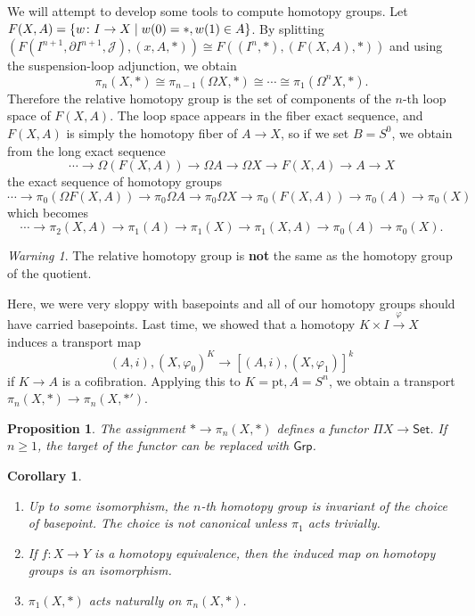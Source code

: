 \documentclass[leqno, openany]{memoir}
\newtheorem{cor}[thm]{Corollary}
\newtheorem{prop}[thm]{Proposition}
\theoremstyle{definition}
\theoremstyle{remark}
\newtheorem{warn}[thm]{Warning}
\theoremstyle{plain}
\theoremstyle{definition}
\theoremstyle{remark}
\newcommand{\mc}[1]{\mathcal{#1}}
\newcommand{\mr}[1]{\mathrm{#1}}
\newcommand{\ms}[1]{\mathsf{#1}}
\begin{document}
We will attempt to develop some tools to compute homotopy groups. Let $F(X,A) = \qty{w \colon I \to X \mid w(0) = *, w(1) \in A}$. By splitting $(F(I^{n+1}, \partial I^{n+1}, \mc{J}), (x, A, *)) \cong F((I^n, *), (F(X,A), *))$ and using the suspension-loop adjunction, we obtain
\[ \pi_n(X, *) \cong \pi_{n-1}(\Omega X, *) \cong \cdots \cong \pi_1(\Omega^n X, *). \]
Therefore the relative homotopy group is the set of components of the $n$-th loop space of $F(X,A)$. The loop space appears in the fiber exact sequence, and $F(X,A)$ is simply the homotopy fiber of $A \to X$, so if we set $B = S^0$, we obtain from the long exact sequence
\[ \cdots \to \Omega(F(X,A)) \to \Omega A \to \Omega X \to F(X,A) \to A \to X \]
the exact sequence of homotopy groups
\[ \cdots \to \pi_0(\Omega F(X,A)) \to \pi_0 \Omega A \to \pi_0 \Omega X \to \pi_0(F(X,A)) \to \pi_0(A) \to \pi_0(X) \]
which becomes
\[ \cdots \to \pi_2(X,A) \to \pi_1(A) \to \pi_1(X) \to \pi_1(X,A) \to \pi_0(A) \to \pi_0(X). \]
\begin{warn}
    The relative homotopy group is \textbf{not} the same as the homotopy group of the quotient. 
\end{warn}

Here, we were very sloppy with basepoints and all of our homotopy groups should have carried basepoints. Last time, we showed that a homotopy $K \times I \xrightarrow{\varphi} X$ induces a transport map
\[ (A, i), (X, \varphi_0)^K \to [(A,i), (X, \varphi_1)]^k \]
if $K \to A$ is a cofibration. Applying this to $K = \mr{pt}, A = S^n$, we obtain a transport $\pi_n(X, *) \to \pi_n(X, *')$.

\begin{prop}
    The assignment $* \to \pi_n(X, *)$ defines a functor $\Pi X \to \ms{Set}$. If $n \geq 1$, the target of the functor can be replaced with $\ms{Grp}$.
\end{prop}

\begin{cor}
    \begin{enumerate}
        \item Up to some isomorphism, the $n$-th homotopy group is invariant of the choice of basepoint. The choice is not canonical unless $\pi_1$ acts trivially.
        \item If $f \colon X \to Y$ is a homotopy equivalence, then the induced map on homotopy groups is an isomorphism.
        \item $\pi_1(X,*)$ acts naturally on $\pi_n(X,*)$.
    \end{enumerate}
\end{cor}
\end{document}
